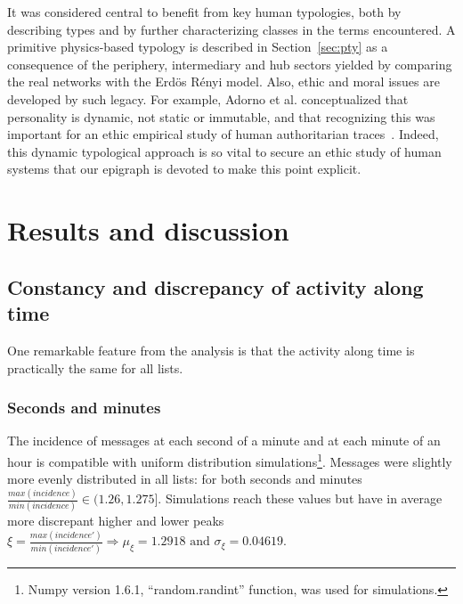 \documentclass[%
 aip,
 jmp,%
 amsmath,amssymb,
 reprint,%
]{revtex4-1}
\begin{document}
It was considered central to benefit from key human typologies, both by describing types and by further characterizing classes in the terms encountered. A primitive physics-based typology is described in Section~\ref{sec:pty} as a consequence of the periphery, intermediary and hub sectors yielded by comparing the real networks with the Erd\"os R\'enyi model.
Also, ethic and moral issues are developed by such legacy. For example, Adorno et al. conceptualized that personality is dynamic, not static or immutable, and that recognizing this was important for an ethic empirical study of human authoritarian traces~\cite{adorno}.
Indeed, this dynamic typological approach is so vital to secure an ethic study of human systems that our epigraph is devoted to make this point explicit.

%

\section{Results and discussion}

\subsection{Constancy and discrepancy of activity along time}\label{constDisc}
One remarkable feature from the analysis is that the activity along time is practically the same for all lists.

\subsubsection{Seconds and minutes}
The incidence of messages at each second of a minute and at each minute of an hour is compatible with uniform distribution simulations\footnote{Numpy version 1.6.1, ``random.randint'' function, was used for simulations.}. Messages were slightly more evenly distributed in all lists: for both seconds and minutes  $\frac{max(incidence)}{min(incidence)} \in (1.26,1.275]$. Simulations reach these values  but have in average more discrepant higher and lower peaks $\xi=\frac{max(incidence')}{min(incidence')} \Rightarrow \mu_\xi=1.2918 \text{ and } \sigma_\xi=0.04619$.
\end{document}
